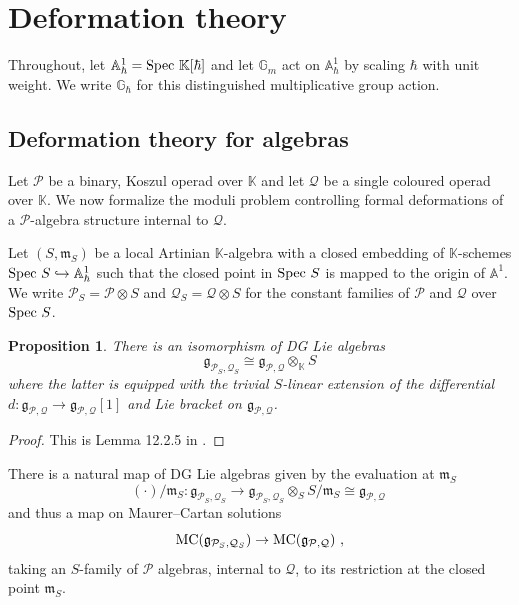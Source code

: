 \documentclass[11pt]{amsart}
\numberwithin{equation}{section}
\newtheorem{prop}[theo]{Proposition}
\theoremstyle{definition}
\newcommand{\bb}{\mathbb}
\newcommand{\mc}{\mathcal}
\newcommand{\mf}{\mathfrak}
\DeclareMathOperator{\Hom}{Hom}
\newcommand{\K}{{\bb K}}
\newcommand{\ik}{{\bb K}}
\newcommand{\Spec}{{\textup{Spec\ }}}
\newcommand{\Alg}{{\textup{Alg}}}
\newcommand{\Op}{{\textup{Op}}}
\newcommand{\MC}{{{\textup{MC}}}}
\newcommand{\0}{{\textbf{0}}}
\newcommand{\g}{{\mf{g}}}
\def\IA{\mathbb{A}}
\def\IG{\mathbb{G}}
\def\PP{{\mc P}}
\def\QQ{{\mc Q}}
\def\gf{\mathfrak{g}}
\def \mf{\mathfrak}
\def \Op{\mathrm{Op}}
\begin{document}

\section{Deformation theory}\label{chsec}
Throughout, let $\IA^1_\hbar = \Spec \ik[\hbar]$ and let $\IG_m$ act on $\IA^1_\hbar$ by scaling $\hbar $ with unit weight. We write $\IG_\hbar$ for this distinguished multiplicative group action.

\subsection{Deformation theory for algebras}\label{mapdefsec}

Let $\PP$ be a binary, Koszul operad over $\ik$ and let $\QQ$ be a single coloured operad over $\ik$. We now formalize the moduli problem controlling formal deformations of a $\mc P$-algebra structure internal to $\mc Q$. 

Let $(S,\mf m_S)$ be a local Artinian $\ik$-algebra with a closed embedding of $\ik$-schemes $\Spec S \hookrightarrow \IA^1_{\hbar}$ such that the closed point in $\Spec S$ is mapped to the origin of $\IA^1$. We write $\PP_S = \PP\otimes S$ and $\QQ_S = \QQ\otimes S$ for the constant families of $\PP$ and $\QQ$ over $\Spec S$.



\begin{prop} There is an isomorphism of DG Lie algebras
\[ \g_{\mc P_S,\mc Q_S} \cong \g_{\mc P, \mc Q} \otimes_{\K} S \]
where the latter is equipped with the trivial $S$-linear extension of the differential $d:\g_{\mc P,\mc Q} \to \g_{\mc P,\mc Q}[1]$ and Lie bracket on $ \g_{\mc P,\mc Q}$.
\end{prop}
\begin{proof}
This is Lemma 12.2.5 in \cite{LV}.
\end{proof}

There is a natural map of DG Lie algebras given by the evaluation at $\mf m_S$
\[ (\cdot)/\mf m_S : \g_{\mc P_S,\mc Q_S} \to \g_{\mc P_S,\mc Q_S} \otimes_{S} S/\mf m_S \cong \g_{\mc P, \mc Q} \  \]
and thus a map on Maurer--Cartan solutions
\[
\MC(\gf_{\PP_S,\QQ_S}) \rightarrow \MC({\gf_{\PP,\QQ}})~,
\]
taking an $S$-family of $\PP$ algebras, internal to $\QQ$, to its restriction at the closed point $\mf m_S$.


\end{document}
